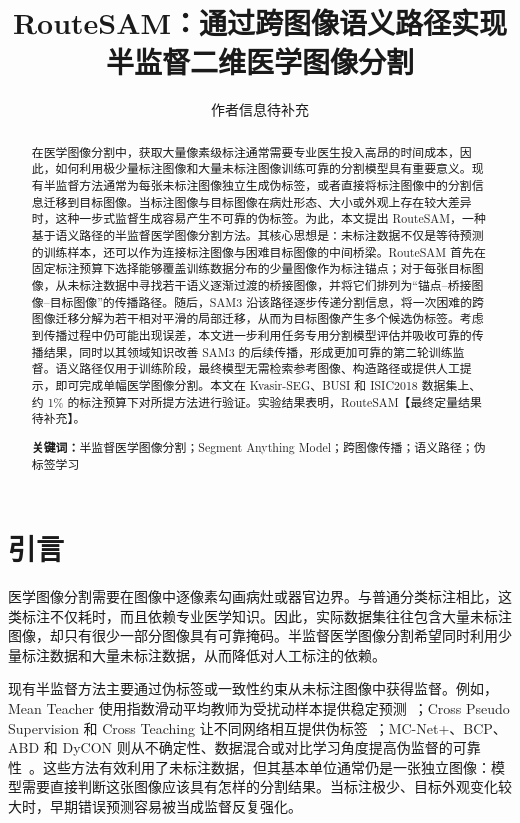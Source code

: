 \documentclass[UTF8,a4paper,10pt]{ctexart}
\title{RouteSAM：通过跨图像语义路径实现半监督二维医学图像分割}
\author{作者信息待补充}
\date{}
\begin{document}
\maketitle

\begin{abstract}
在医学图像分割中，获取大量像素级标注通常需要专业医生投入高昂的时间成本，因此，如何利用极少量标注图像和大量未标注图像训练可靠的分割模型具有重要意义。现有半监督方法通常为每张未标注图像独立生成伪标签，或者直接将标注图像中的分割信息迁移到目标图像。当标注图像与目标图像在病灶形态、大小或外观上存在较大差异时，这种一步式监督生成容易产生不可靠的伪标签。为此，本文提出 RouteSAM，一种基于语义路径的半监督医学图像分割方法。其核心思想是：未标注数据不仅是等待预测的训练样本，还可以作为连接标注图像与困难目标图像的中间桥梁。RouteSAM 首先在固定标注预算下选择能够覆盖训练数据分布的少量图像作为标注锚点；对于每张目标图像，从未标注数据中寻找若干语义逐渐过渡的桥接图像，并将它们排列为“锚点--桥接图像--目标图像”的传播路径。随后，SAM3 沿该路径逐步传递分割信息，将一次困难的跨图像迁移分解为若干相对平滑的局部迁移，从而为目标图像产生多个候选伪标签。考虑到传播过程中仍可能出现误差，本文进一步利用任务专用分割模型评估并吸收可靠的传播结果，同时以其领域知识改善 SAM3 的后续传播，形成更加可靠的第二轮训练监督。语义路径仅用于训练阶段，最终模型无需检索参考图像、构造路径或提供人工提示，即可完成单幅医学图像分割。本文在 Kvasir-SEG、BUSI 和 ISIC2018 数据集上、约 1\% 的标注预算下对所提方法进行验证。实验结果表明，RouteSAM【最终定量结果待补充】。

\noindent\textbf{关键词：}半监督医学图像分割；Segment Anything Model；跨图像传播；语义路径；伪标签学习
\end{abstract}

\section{引言}

医学图像分割需要在图像中逐像素勾画病灶或器官边界。与普通分类标注相比，这类标注不仅耗时，而且依赖专业医学知识。因此，实际数据集往往包含大量未标注图像，却只有很少一部分图像具有可靠掩码。半监督医学图像分割希望同时利用少量标注数据和大量未标注数据，从而降低对人工标注的依赖。

现有半监督方法主要通过伪标签或一致性约束从未标注图像中获得监督。例如，Mean Teacher 使用指数滑动平均教师为受扰动样本提供稳定预测~\cite{tarvainen2017meanteacher}；Cross Pseudo Supervision 和 Cross Teaching 让不同网络相互提供伪标签~\cite{chen2021cps,luo2022crossteaching}；MC-Net+、BCP、ABD 和 DyCON 则从不确定性、数据混合或对比学习角度提高伪监督的可靠性~\cite{wu2022mcnet,bai2023bcp,chi2024abd,assefa2025dycon}。这些方法有效利用了未标注数据，但其基本单位通常仍是一张独立图像：模型需要直接判断这张图像应该具有怎样的分割结果。当标注极少、目标外观变化较大时，早期错误预测容易被当成监督反复强化。
\end{document}
